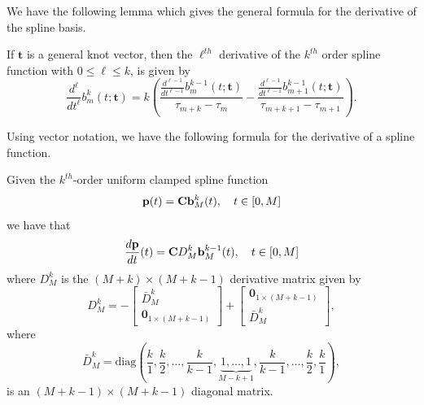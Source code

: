 We have the following lemma which gives the general formula for the derivative of the spline basis.
\begin{lemma}\label{lem:derivative_basis_functions}
If $\mathbf{t}$ is a general knot vector, then the $\ell^{th}$ derivative of the $k^{th}$ order spline function with  $0\leq \ell \leq k$, is given by
\[
\frac{d^\ell}{dt^\ell}b_m^k(t; \mathbf{t}) = k\left(\frac{\frac{d^{\ell-1}}{dt^{\ell-1}}b_m^{k-1}(t; \mathbf{t})}{\tau_{m+k}-\tau_m} - \frac{\frac{d^{\ell-1}}{dt^{\ell-1}}b_{m+1}^{k-1}(t; \mathbf{t})}{\tau_{m+k+1}-\tau_{m+1}} \right).
\]	
\end{lemma}

Using vector notation, we have the following formula for the derivative of a spline function.
\begin{lemma} \label{lem:derivative_of_spline}
Given the $k^{th}$-order uniform clamped spline function
\[
\mathbf{p}(t) = \mathbf{C} \mathbf{b}_M^k(t), \quad t\in[0, M]
\]
we have that
\[
\frac{d\mathbf{p}}{dt}(t) = \mathbf{C} D_M^k \mathbf{b}_M^{k-1}(t), \quad t\in[0, M]
\]	
where $D_M^k$ is the $(M+k)\times (M+k-1)$ derivative matrix given by
\begin{equation}\label{eq:D_k}
D_M^k = -\begin{bmatrix}\bar{D}_M^k \\ \mathbf{0}_{1\times(M+k-1)} \end{bmatrix} + \begin{bmatrix}\mathbf{0}_{1\times(M+k-1)} \\ \bar{D}_M^k \end{bmatrix},
\end{equation}
where
\begin{equation}\label{eq:D_k_bar}
\bar{D}_M^k = \text{diag}\left(\frac{k}{1}, \frac{k}{2}, \dots, \frac{k}{k-1}, \underbrace{1, \dots, 1}_{M-k+1}, \frac{k}{k-1}, \dots, \frac{k}{2}, \frac{k}{1}\right),
\end{equation}
is an $(M+k-1)\times(M+k-1)$ diagonal matrix.
\end{lemma}
